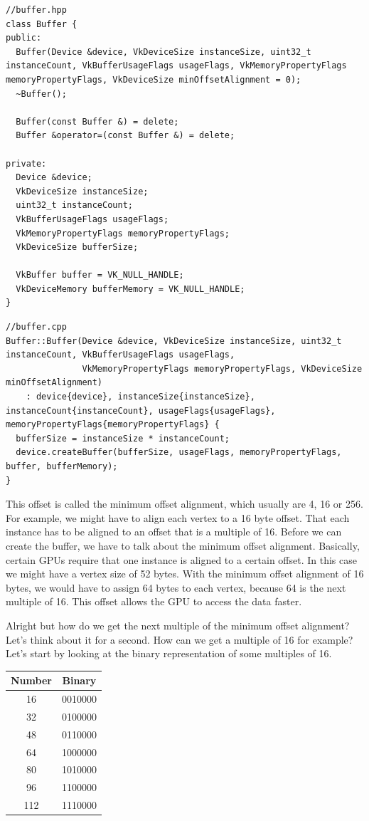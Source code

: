 \documentclass[12pt]{report} \usepackage{preamble}
\begin{document}
\begin{lstlisting}[Language=C++]
//buffer.hpp
class Buffer {
public:
  Buffer(Device &device, VkDeviceSize instanceSize, uint32_t instanceCount, VkBufferUsageFlags usageFlags, VkMemoryPropertyFlags memoryPropertyFlags, VkDeviceSize minOffsetAlignment = 0);
  ~Buffer();

  Buffer(const Buffer &) = delete;
  Buffer &operator=(const Buffer &) = delete;

private:
  Device &device;
  VkDeviceSize instanceSize;
  uint32_t instanceCount;
  VkBufferUsageFlags usageFlags;
  VkMemoryPropertyFlags memoryPropertyFlags;
  VkDeviceSize bufferSize;

  VkBuffer buffer = VK_NULL_HANDLE;
  VkDeviceMemory bufferMemory = VK_NULL_HANDLE;
}
\end{lstlisting}

\begin{lstlisting}[Language=C++]
//buffer.cpp
Buffer::Buffer(Device &device, VkDeviceSize instanceSize, uint32_t instanceCount, VkBufferUsageFlags usageFlags, 
               VkMemoryPropertyFlags memoryPropertyFlags, VkDeviceSize minOffsetAlignment) 
    : device{device}, instanceSize{instanceSize}, instanceCount{instanceCount}, usageFlags{usageFlags}, memoryPropertyFlags{memoryPropertyFlags} {
  bufferSize = instanceSize * instanceCount;
  device.createBuffer(bufferSize, usageFlags, memoryPropertyFlags, buffer, bufferMemory);
}
\end{lstlisting}

This offset is called the minimum offset alignment, which usually are 4, 16 or 256. For example, we might have to align each vertex to a 16 byte offset. That each instance has to be aligned to an offset that is a multiple of 16.
Before we can create the buffer, we have to talk about the minimum offset alignment. Basically, certain GPUs require that one instance is aligned to a certain offset.
In this case we might have a vertex size of 52 bytes. With the minimum offset alignment of 16 bytes, we would have to assign 64 bytes to each vertex, because 64 is the next multiple of 16.
This offset allows the GPU to access the data faster.

Alright but how do we get the next multiple of the minimum offset alignment? Let's think about it for a second.
How can we get a multiple of 16 for example? Let's start by looking at the binary representation of some multiples of 16.

\begin{table}[h]
	\centering
	\begin{tabular}{|c|c|}
		\hline
		Number & Binary  \\
		\hline
		16     & 0010000 \\
		32     & 0100000 \\
		48     & 0110000 \\
		64     & 1000000 \\
		80     & 1010000 \\
		96     & 1100000 \\
		112    & 1110000 \\
		\hline
	\end{tabular}
\end{table}
\end{document}
